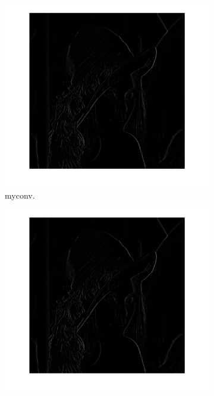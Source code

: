 \documentclass[12pt]{article}
\begin{document}
\begin{figure}[htbp]
        \centering
        \begin{subfigure}[b]{0.32\textwidth}
                \includegraphics[width=\textwidth]{images/conv1}
                \caption{myconv.}
                \label{fig:myconv}
        \end{subfigure}
        \begin{subfigure}[b]{0.32\textwidth}
                \includegraphics[width=\textwidth]{images/conv2}

\end{subfigure}
\end{figure}
\end{document}

